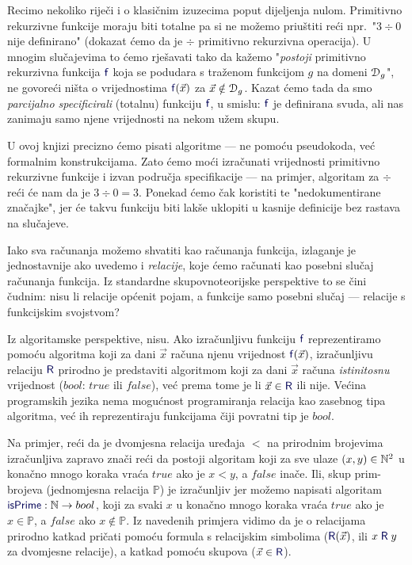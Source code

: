 Recimo nekoliko riječi i o klasičnim izuzecima poput dijeljenja nulom. Primitivno rekurzivne funkcije moraju biti totalne pa si ne možemo priuštiti reći npr.\ "$3\div0$ nije definirano" (dokazat ćemo da je $\div$ primitivno rekurzivna operacija). U mnogim slučajevima to ćemo rješavati tako da kažemo "\emph{postoji} primitivno rekurzivna funkcija $\f{f}$ koja se podudara s traženom funkcijom $g$ na domeni $\mathcal D_{g}$", ne govoreći ništa o vrijednostima $\f{f}(\vec x)$ za $\vec x\notin\mathcal D_{g}$. %
Kazat ćemo tada da smo \emph{parcijalno specificirali} (totalnu) funkciju $\f{f}$, u smislu: $\f{f}$ je definirana svuda, ali nas zanimaju samo njene vrijednosti na nekom užem skupu.

U ovoj knjizi precizno ćemo pisati algoritme --- ne pomoću pseudokoda, već formalnim konstrukcijama. Zato ćemo moći izračunati vrijednosti primitivno rekurzivne funkcije i izvan područja specifikacije --- na primjer, algoritam za $\div$ reći će nam da je $3\div 0=3$. Ponekad ćemo čak koristiti te "nedokumentirane značajke", jer će takvu funkciju biti lakše uklopiti u kasnije definicije bez rastava na slučajeve. %


Iako sva računanja možemo shvatiti kao računanja funkcija, izlaganje je jednostavnije ako uvedemo i \emph{relacije}, koje ćemo računati kao posebni slučaj računanja funkcija. Iz standardne skupovnoteorijske perspektive to se čini čudnim: nisu li relacije općenit pojam, a funkcije samo posebni slučaj --- relacije s funkcijskim svojstvom?

Iz algoritamske perspektive, nisu. Ako izračunljivu funkciju $\f{f}$ reprezentiramo po\-mo\-ću algoritma koji za dani $\vec x$ računa njenu vrijednost $\f{f}(\vec x)$, izračunljivu relaciju $\f{R}$ prirodno je predstaviti algoritmom koji za dani $\vec x$ računa \emph{istinitosnu} vrijednost ($bool$: $\mathit{true}$ ili $\mathit{false}$), već prema tome je li $\vec x\in\f{R}$ ili nije. Većina programskih jezika nema mogućnost programiranja relacija kao zasebnog tipa algoritma, već ih reprezentiraju funkcijama čiji povratni tip je $bool$.

Na primjer, reći da je dvomjesna relacija uređaja $<$ na prirodnim brojevima iz\-ra\-čun\-lji\-va zapravo znači reći da postoji algoritam koji za sve ulaze $(x,y)\in{\mathbb N}^2$ u konačno mnogo koraka vraća $\mathit{true}$ ako je $x<y$, a $\mathit{false}$ inače. Ili, skup prim-brojeva (jednomjesna relacija $\mathbb P$) je izračunljiv jer možemo napisati algoritam $\f{isPrime}:\N\to bool$, koji za svaki $x$ u konačno mnogo koraka vraća $\mathit{true}$ ako je $x\in\mathbb P$, a $\mathit{false}$ ako $x\notin\mathbb P$. Iz navedenih primjera vidimo da je o relacijama prirodno katkad pričati pomoću formula s relacijskim simbolima ($\f{R}(\vec x)$, ili $x\mathrel{\f R}y$ za dvomjesne relacije), a katkad pomoću skupova ($\vec x\in\f{R}$).

